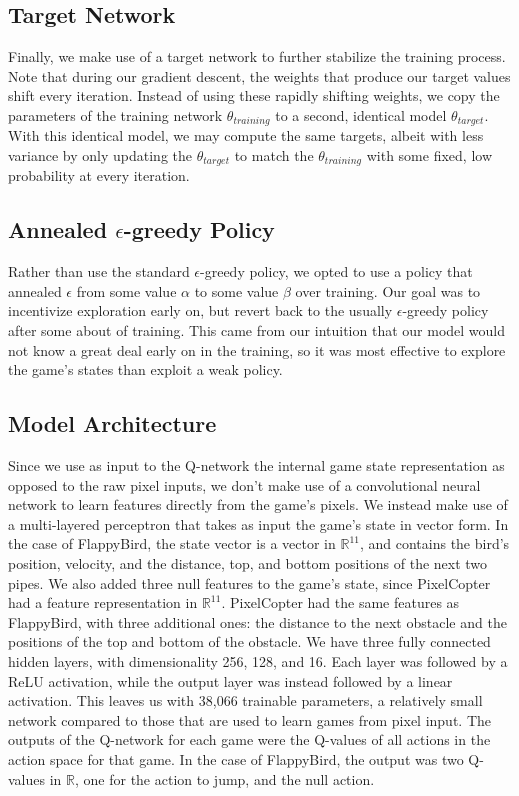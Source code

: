 \documentclass{article}
\begin{document}
\subsection{Target Network}
Finally, we make use of a target network to further stabilize the training process. 
Note that during our gradient descent, the weights that produce our target values shift every iteration.
Instead of using these rapidly shifting weights, we copy the parameters of the training network $\theta_{training}$ to a second, identical model $\theta_{target}$.
With this identical model, we may compute the same targets, albeit with less variance by only updating the $\theta_{target}$ to match the $\theta_{training}$ with some fixed, low probability at every iteration.

\subsection{Annealed $\epsilon$-greedy Policy}
Rather than use the standard $\epsilon$-greedy policy, we opted to use a policy that annealed $\epsilon$ from some value $\alpha$ to some value $\beta$ over training.
Our goal was to incentivize exploration early on, but revert back to the usually $\epsilon$-greedy policy after some about of training.
This came from our intuition that our model would not know a great deal early on in the training, so it was most effective to explore the game's states than exploit a weak policy.


\subsection{Model Architecture}
Since we use as input to the Q-network the internal game state representation as opposed to the raw pixel inputs, we don't make use of a convolutional neural network to learn features directly from the game's pixels.
We instead make use of a multi-layered perceptron that takes as input the game's state in vector form.
In the case of FlappyBird, the state vector is a vector in $\mathbb{R}^{11}$, and contains the bird's position, velocity, and the distance, top, and bottom positions of the next two pipes.
We also added three null features to the game's state, since PixelCopter had a feature representation in $\mathbb{R}^{11}$.
PixelCopter had the same features as FlappyBird, with three additional ones: the distance to the next obstacle and the positions of the top and bottom of the obstacle.
We have three fully connected hidden layers, with dimensionality 256, 128, and 16. 
Each layer was followed by a ReLU activation, while the output layer was instead followed by a linear activation. 
This leaves us with 38,066 trainable parameters, a relatively small network compared to those that are used to learn games from pixel input.
The outputs of the Q-network for each game were the Q-values of all actions in the action space for that game.
In the case of FlappyBird, the output was two Q-values in $\mathbb{R}$, one for the action to jump, and the null action.
\end{document}
